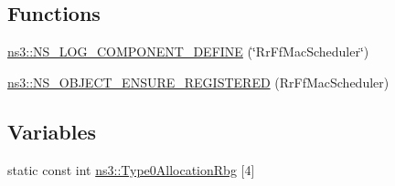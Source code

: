 \subsection*{Functions}
\begin{DoxyCompactItemize}
\item 
\hyperlink{namespacens3_a7df660b4fc3f695d0449acd65bfad6b9}{ns3\+::\+N\+S\+\_\+\+L\+O\+G\+\_\+\+C\+O\+M\+P\+O\+N\+E\+N\+T\+\_\+\+D\+E\+F\+I\+NE} (\char`\"{}Rr\+Ff\+Mac\+Scheduler\char`\"{})
\item 
\hyperlink{namespacens3_a68bc3dbdc23bbe11d71cabb9591bede1}{ns3\+::\+N\+S\+\_\+\+O\+B\+J\+E\+C\+T\+\_\+\+E\+N\+S\+U\+R\+E\+\_\+\+R\+E\+G\+I\+S\+T\+E\+R\+ED} (Rr\+Ff\+Mac\+Scheduler)
\end{DoxyCompactItemize}
\subsection*{Variables}
\begin{DoxyCompactItemize}
\item 
static const int \hyperlink{namespacens3_ae42dc1cda5a7bc1f52f3c0ecf60f5f3b}{ns3\+::\+Type0\+Allocation\+Rbg} \mbox{[}4\mbox{]}
\end{DoxyCompactItemize}
